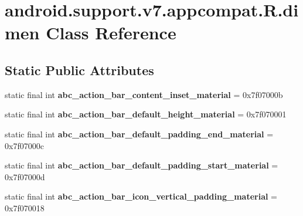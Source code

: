 \hypertarget{classandroid_1_1support_1_1v7_1_1appcompat_1_1_r_1_1dimen}{}\section{android.\+support.\+v7.\+appcompat.\+R.\+dimen Class Reference}
\label{classandroid_1_1support_1_1v7_1_1appcompat_1_1_r_1_1dimen}
\subsection*{Static Public Attributes}
\begin{DoxyCompactItemize}
\item 
\hypertarget{classandroid_1_1support_1_1v7_1_1appcompat_1_1_r_1_1dimen_a16b8f74d21224eeb5be3d887e9419862}{}static final int {\bfseries abc\+\_\+action\+\_\+bar\+\_\+content\+\_\+inset\+\_\+material} = 0x7f07000b\label{classandroid_1_1support_1_1v7_1_1appcompat_1_1_r_1_1dimen_a16b8f74d21224eeb5be3d887e9419862}

\item 
\hypertarget{classandroid_1_1support_1_1v7_1_1appcompat_1_1_r_1_1dimen_a8ce0c5f4f00b5744f6403f67c48cb4da}{}static final int {\bfseries abc\+\_\+action\+\_\+bar\+\_\+default\+\_\+height\+\_\+material} = 0x7f070001\label{classandroid_1_1support_1_1v7_1_1appcompat_1_1_r_1_1dimen_a8ce0c5f4f00b5744f6403f67c48cb4da}

\item 
\hypertarget{classandroid_1_1support_1_1v7_1_1appcompat_1_1_r_1_1dimen_a067da9abef12ba2f906b6080a5a912d0}{}static final int {\bfseries abc\+\_\+action\+\_\+bar\+\_\+default\+\_\+padding\+\_\+end\+\_\+material} = 0x7f07000c\label{classandroid_1_1support_1_1v7_1_1appcompat_1_1_r_1_1dimen_a067da9abef12ba2f906b6080a5a912d0}

\item 
\hypertarget{classandroid_1_1support_1_1v7_1_1appcompat_1_1_r_1_1dimen_a993d714aa584cfe3ef4b3f91fd062aa2}{}static final int {\bfseries abc\+\_\+action\+\_\+bar\+\_\+default\+\_\+padding\+\_\+start\+\_\+material} = 0x7f07000d\label{classandroid_1_1support_1_1v7_1_1appcompat_1_1_r_1_1dimen_a993d714aa584cfe3ef4b3f91fd062aa2}

\item 
\hypertarget{classandroid_1_1support_1_1v7_1_1appcompat_1_1_r_1_1dimen_a4e148bb5abc8982092986153140c5645}{}static final int {\bfseries abc\+\_\+action\+\_\+bar\+\_\+icon\+\_\+vertical\+\_\+padding\+\_\+material} = 0x7f070018\label{classandroid_1_1support_1_1v7_1_1appcompat_1_1_r_1_1dimen_a4e148bb5abc8982092986153140c5645}


\end{DoxyCompactItemize}
